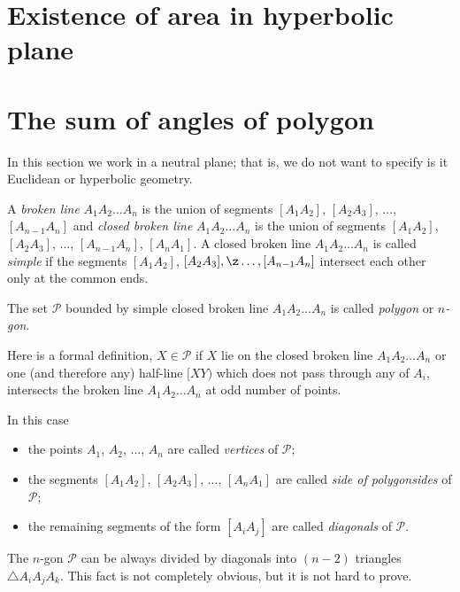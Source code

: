 {\section*{Existence of area in hyperbolic plane}




\section*{The sum of angles of polygon} 

In this section we work in a neutral plane;
that is, we do not want to specify is it Euclidean or hyperbolic geometry.

A \emph{broken line} $A_1A_2\dots A_n$
is the union of segments $[A_1A_2]$, $[A_2A_3]$, ..., $[A_{n-1}A_n]$
and  \emph{closed broken line} $A_1A_2\dots A_n$
is the union of segments $[A_1A_2]$, $[A_2A_3]$, ..., $[A_{n-1}A_n]$, $[A_nA_1]$.
A closed broken line  $A_1A_2\dots A_n$ is called \emph{simple} if the segments  $[A_1A_2]$, $[A_2A_3], \z\dots,[A_{n-1}A_n]$ intersect each other only at the common ends.

The set $\mathcal{P}$ bounded by simple closed broken line $A_1A_2\dots A_n$ is called
\emph{polygon} or \emph{$n$-gon}.

Here is a formal definition, $X\in\mathcal{P}$ if $X$ lie on the closed broken line $A_1A_2\dots A_n$ or one (and therefore any) half-line $[XY)$ which does not pass through any of $A_i$, intersects the broken line $A_1A_2\dots A_n$ at odd number of points.

In this case
\begin{itemize}
\item the points $A_1$, $A_2$, ..., $A_n$ are called \emph{vertices} of $\mathcal{P}$;
\item the segments $[A_1A_2]$, $[A_2A_3]$, ..., $[A_{n}A_1]$ 
are called 
\emph{side of polygon}\emph{sides} of $\mathcal{P}$;
\item the remaining segments of the form $[A_iA_j]$ are called  
\emph{diagonals} of $\mathcal{P}$.
\end{itemize}

The  $n$-gon $\mathcal{P}$ can be always divided by diagonals into $(n-2)$ triangles $\triangle A_iA_jA_k$.
This fact is not completely obvious, but it is not hard to prove.

}
